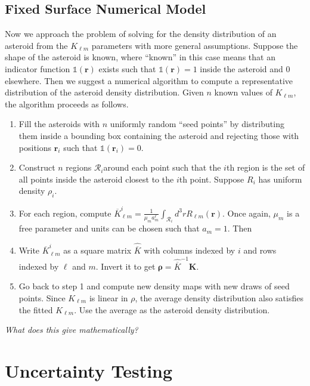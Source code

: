 \documentclass[linenumbers]{aastex631}
\newcommand{\jtd}[1]{{\color{red}\textit{#1}}}
\begin{document}
\subsection{Fixed Surface Numerical Model}
Now we approach the problem of solving for the density distribution of an asteroid from the $K_{\ell m}$ parameters with more general assumptions. Suppose the shape of the asteroid is known, where ``known'' in this case means that an indicator function $\mathds{1}(\bm r)$ exists such that $\mathds{1}(\bm r) = 1$  inside the asteroid and 0 elsewhere. Then we suggest a numerical algorithm to compute a representative distribution of the asteroid density distribution. Given $n$ known values of $K_{\ell m}$, the algorithm proceeds as follows.
\begin{enumerate}
\item Fill the asteroids with $n$ uniformly random ``seed points'' by distributing them inside a bounding box containing the asteroid and rejecting those with positions $\bm r_i$ such that $\mathds{1}(\bm r_i) = 0.$
\item Construct $n$ regions $\mathcal{R}_i$around each point such that the $i$th region is the set of all points inside the asteroid closest to the $i$th point. Suppose $R_i$ has uniform density $\rho_i$.
\item For each region, compute $\overline K_{\ell m}^i = \frac{1}{\mu_m a_m^\ell}\int_{\mathcal{R}_i} d^3 r R_{\ell m}(\bm r)$. Once again, $\mu_m$ is a free parameter and units can be chosen such that $a_m=1$. Then %
\item Write $\overline K_{\ell m}^i$ as a square matrix $\hat{\overline K}$ with columns indexed by $i$ and rows indexed by $\ell$ and $m$. Invert it to get $\bm \rho = \hat {\overline K}^{-1} \bm K$.
\item Go back to step 1 and compute new density maps with new draws of seed points. Since $K_{\ell m}$ is linear in $\rho$, the average density distribution also satisfies the fitted $K_{\ell m}$. Use the average as the asteroid density distribution.
\end{enumerate}

\jtd{What does this give mathematically?}



\section{Uncertainty Testing}
\end{document}
